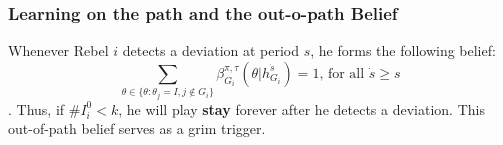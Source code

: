 \documentclass[12pt,letter]{article}
\theoremstyle{definition}
\theoremstyle{remark}
\theoremstyle{claim}
\begin{document}
%
%
%



\subsubsection{Learning on the path and the out-o-path Belief}

Whenever Rebel $i$ detects a deviation at period $s$, he forms the following belief: 
\begin{equation}
\label{eq_grim_trigger}
\sum_{\theta \in \{\theta:\theta_j=I,j\notin G_i\}}\beta^{\pi,\tau}_{G_i}({\theta}|h^{\dot{s}}_{G_i})=1 \text{, for all $\dot{s}\geq s$}
\end{equation}
. Thus, if $\# I^0_i<k$, he will play \textbf{stay} forever after he detects a deviation. This out-of-path belief serves as a grim trigger. 
\end{document}
